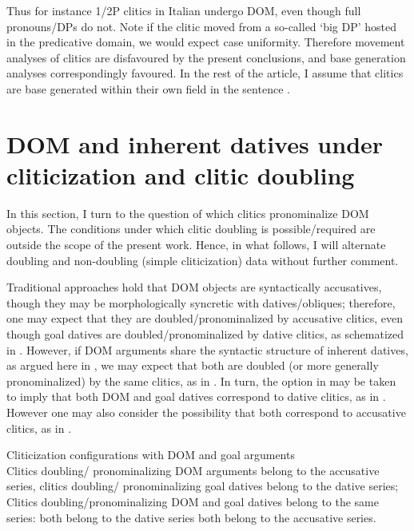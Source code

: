 \documentclass[output=paper,colorlinks,citecolor=brown,nonflat]{./langscibook}
\begin{document}
Thus for instance 1/2P clitics in Italian undergo DOM, even though full pronouns/DPs do not. Note if the clitic moved from a so-called ‘big DP’ hosted in the predicative domain, we would expect case uniformity. Therefore movement analyses of clitics are disfavoured by the present conclusions, and base generation analyses correspondingly favoured. In the rest of the article, I assume that clitics are base generated within their own field in the sentence \citep{Sportiche1996}.

\section{DOM and inherent datives under cliticization and clitic doubling}\label{sec:manzini:3}

In this section, I turn to the question of which clitics pronominalize DOM objects. The conditions under which clitic doubling is possible/required are outside the scope of the present work. Hence, in what follows, I will alternate doubling and non-doubling (simple cliticization) data without further comment. 

Traditional approaches hold that DOM objects are syntactically accusatives, though they may be morphologically syncretic with datives/obliques; therefore, one may expect that they are doubled/pronominalized by accusative clitics, even though goal datives are doubled/pronominalized by dative clitics, as schematized in . However, if DOM arguments share the syntactic structure of inherent datives, as argued here in , we may expect that both are doubled (or more generally pronominalized) by the same clitics, as in . In turn, the option in  may be taken to imply that both DOM and goal datives correspond to dative clitics, as in . However one may also consider the possibility that both correspond to accusative clitics, as in .

\ea%
    \label{ex:manzini:20}
    Cliticization configurations with DOM and goal arguments\\
    \ea\label{ex:manzini:20a} 
    Clitics doubling/ pronominalizing DOM arguments belong to the accusative series, clitics doubling/ pronominalizing goal datives belong to the dative series;
    \ex\label{ex:manzini:20b} 
    Clitics doubling/pronominalizing DOM and goal datives belong to the same series:
        \ea\label{ex:manzini:20bi} 
        both belong to the dative series
        \ex\label{ex:manzini:20bii} 
        both belong to the accusative series.
        \z
    \z
\z
\end{document}

